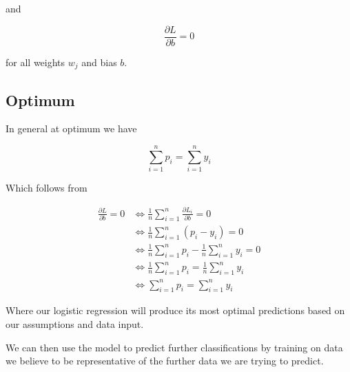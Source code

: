 \documentclass{article}
\theoremstyle{remark}
\begin{document}
and

\begin{equation*}
\frac{\partial L}{\partial b} = 0
\end{equation*}

for all weights $w_j$ and bias $b$.

\subsection{Optimum}

In general at optimum we have 

\begin{equation}
\sum_{i=1}^{n}p_i = \sum_{i=1}^{n}y_i
\end{equation}

Which follows from

\begin{align*}
\frac{\partial L}{\partial b} = 0
  &\iff \frac{1}{n}\sum_{i=1}^{n}\frac{\partial L_i}{\partial b} = 0 \\
  &\iff \frac{1}{n}\sum_{i=1}^{n} (p_i - y_i) = 0 \\
  &\iff \frac{1}{n}\sum_{i=1}^{n} p_i - \frac{1}{n}\sum_{i=1}^{n} y_i = 0 \\
  &\iff \frac{1}{n}\sum_{i=1}^{n} p_i = \frac{1}{n}\sum_{i=1}^{n} y_i \\
  &\iff \sum_{i=1}^{n} p_i = \sum_{i=1}^{n} y_i
\end{align*}

Where our logistic regression will produce its most optimal predictions
based on our assumptions and data input.

We can then use the model to predict further classifications by training on data
we believe to be representative of the further data we are trying to predict.
\end{document}
